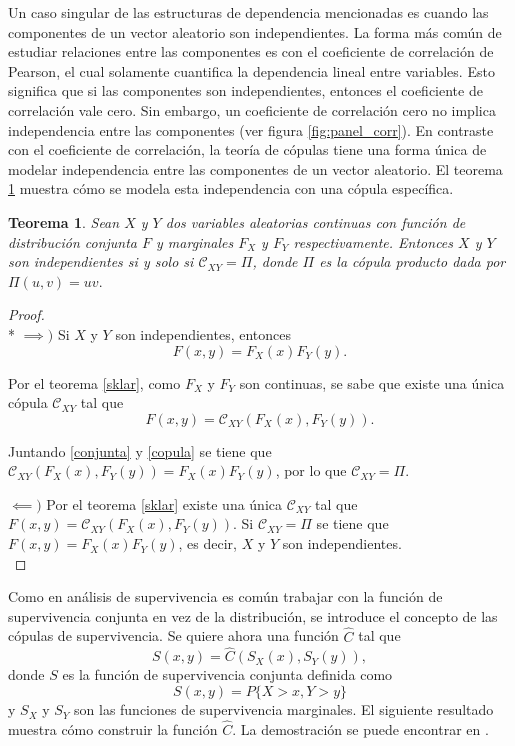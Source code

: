 \documentclass[11pt,a4paper]{article}
\newcommand{\C}{\mathcal{C}}
\newtheorem{theorem}{Teorema}[section]
\begin{document}
Un caso singular de las estructuras de dependencia mencionadas es cuando las componentes de un vector aleatorio son independientes. La forma más común de estudiar relaciones entre las componentes es con el coeficiente de correlación de Pearson, el cual solamente cuantifica la dependencia lineal entre variables. Esto significa que si las componentes son independientes, entonces el coeficiente de correlación vale cero. Sin embargo, un coeficiente de correlación cero no implica independencia entre las componentes (ver figura \ref{fig:panel_corr}). En contraste con el coeficiente de correlación, la teoría de cópulas tiene una forma única de modelar independencia entre las componentes de un vector aleatorio. El teorema \ref{independencia} muestra cómo se modela esta independencia con una cópula específica.\\

\begin{theorem}
\label{independencia}
Sean $X$ y $Y$ dos variables aleatorias continuas con función de distribución conjunta $F$ y marginales $F_X$ y $F_Y$ respectivamente. Entonces $X$ y $Y$ son independientes si y solo si $\C_{XY} = \Pi$, donde $\Pi$ es la cópula producto dada por $\Pi (u,v) = uv.$
\end{theorem}

\begin{proof}\mbox{}\\*
$\implies\big)$ Si $X$ y $Y$ son independientes, entonces
\begin{equation} \label{conjunta}
F(x, y) = F_X(x)F_Y(y).
\end{equation}

Por el teorema \ref{sklar}, como $F_X$ y $F_Y$ son continuas, se sabe que existe una única cópula $\C_{XY}$ tal que
\begin{equation} \label{copula}
F(x, y) = \C_{XY}(F_X(x), F_Y(y)).
\end{equation}

Juntando \eqref{conjunta} y \eqref{copula} se tiene que $\C_{XY}(F_X(x), F_Y(y)) = F_X(x)F_Y(y)$, por lo que $\C_{XY} = \Pi$.

$\impliedby \big)$ Por el teorema \ref{sklar} existe una única $\C_{XY}$ tal que $F(x, y) = \C_{XY}(F_X(x), F_Y(y))$. Si $\C_{XY} = \Pi$ se tiene que $F(x, y) = F_X(x)F_Y(y)$, es decir, $X$ y $Y$ son independientes.\\
\end{proof}

Como en análisis de supervivencia es común trabajar con la función de supervivencia conjunta en vez de la distribución, se introduce el concepto de las cópulas de supervivencia. Se quiere ahora una función $\widehat{C}$ tal que
\begin{equation} \label{suvcop}
S(x, y) = \widehat{C}(S_X(x), S_Y(y)),
\end{equation}
donde $S$ es la función de supervivencia conjunta definida como $$S(x, y ) = P\lbrace X>x, Y>y\rbrace$$ y $S_X$ y $S_Y$ son las funciones de supervivencia marginales. El siguiente resultado muestra cómo construir la función $\widehat{C}$. La demostración se puede encontrar en \citet{nelsen}.\\
\end{document}
